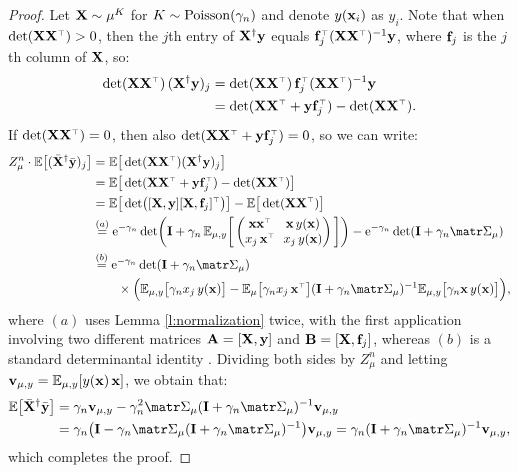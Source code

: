 \documentclass[../../thesis.tex]{subfiles}
\begin{document}
\begin{proof}
  Let $\mathbf X\sim\mu^K$ for $K\sim{\operatorname{Poisson}}(\gamma_n)$ and denote
  $y(\mathbf x_i)$ as $y_i$.
  Note that when $\det(\X\X^\top)>0$, then
  the $j$th entry of $\mathbf X^\dagger\mathbf y$ equals
  $\f_j^\top(\X\X^\top)^{-1}\y$, where $\mathbf f_j$ is the $j$th
  column of $\mathbf X$, so:
  \begin{align*}
    \det(\X\X^\top)\,(\X^\dagger\y)_j
     & = \det(\X\X^\top)\, \f_j^\top(\X\X^\top)^{-1}\y \\
     & =
    \det(\X\X^\top+\y\f_j^\top) - \det(\X\X^\top).
  \end{align*}
  If $\det(\X\X^\top)=0$, then also
  $\det(\X\X^\top+\y\f_j^\top)=0$, so we can write:
  \begin{align*}
    Z_\mu^n\cdot\E\big[(\Xb^\dagger\ybb)_j\big]
     & =  \E\big[\det(\X\X^\top)(\X^\dagger\y)_j\big]                                   \\
     & = \E\big[\det(\X\X^\top+\y\f_j^\top)-\det(\X\X^\top)\big]                        \\
     & =\E\big[\det\!\big([\X,\y][\X,\f_j]^\top\big)\big] - \E\big[\det(\X\X^\top)\big] \\
     & \overset{(a)}{=}\ee^{-\gamma_n}\det\!\bigg(\I +
    \gamma_n\,\E_{\mu,y}\bigg[\begin{pmatrix}\x\x^\top &
               \!\!\x\, y(\x) \\ x_j\,\x^\top&\!\!
               x_j\,y(\x)\end{pmatrix}\bigg]\bigg)
    -\ee^{-\gamma_n}\det(\I+\gamma_n\Sigmab_\mu)                                        \\
     & \overset{(b)}{=}\ee^{-\gamma_n}\det(\I+\gamma_n\Sigmab_\mu)                      \\
     & \qquad \times \Big(\E_{\mu,y}\big[\gamma_n
        x_j\,y(\x)\big] - \E_{\mu}\big[\gamma_n
        x_j\,\x^\top\big](\I+\gamma_n\Sigmab_\mu)^{-1}\E_{\mu,y}\big[\gamma_n\x\,
        y(\x)\big]\Big),
  \end{align*}
  where $(a)$ uses Lemma \ref{l:normalization} twice, with the first
  application involving two different matrices $\mathbf A=[\mathbf X,\mathbf y]$ and
  $\mathbf B=[\mathbf X,\mathbf f_j]$, whereas $(b)$ is a standard determinantal identity
  \cite[see Fact 2.14.2 in][]{matrix-mathematics}.
  Dividing both sides by $Z_\mu^n$ and letting $\mathbf v_{\mu,y}=\mathbb E_{\mu,y}[y(\mathbf x)\,\mathbf x]$, we obtain that:
  \begin{align*}
    \E\big[\Xb^\dagger\ybb\big]
     & = \gamma_n\v_{\mu,y} - \gamma_n^2\Sigmab_\mu(\I+\gamma_n\Sigmab_\mu)^{-1}\v_{\mu,y} \\
     & =\gamma_n\big(\I - \gamma_n\Sigmab_\mu (\I+\gamma_n\Sigmab_\mu)^{-1}\big)\v_{\mu,y}
    =\gamma_n(\I+\gamma_n\Sigmab_\mu)^{-1}\v_{\mu,y},
  \end{align*}
  which completes the proof.
\end{proof}
\end{document}
